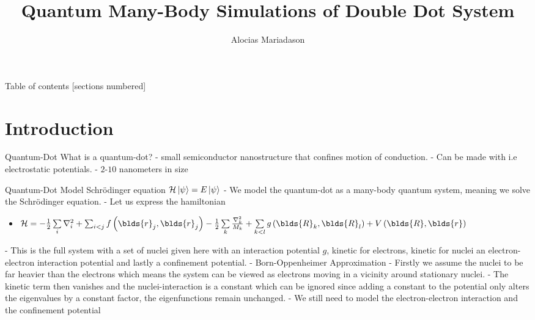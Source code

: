 \documentclass[10pt]{beamer}
\title{Quantum Many-Body Simulations of Double Dot System}
\date{}
\author{Alocias Mariadason}
\institute{Institute of Physics}
\begin{document}
\maketitle

\begin{frame}{Table of contents}
  [sections numbered]
  \tableofcontents[hideallsubsections]
\end{frame}

\section{Introduction}

\begin{frame}[fragile]{Quantum-Dot}
    What is a quantum-dot?
        - small semiconductor nanostructure that confines motion of conduction.
        - Can be made with i.e electrostatic potentials.
        - $2$-$10$ nanometers in size
\end{frame}

\begin{frame}[fragile]{Quantum-Dot Model}
    Schrödinger equation $\mathcal{H}\ket{\psi} = E\ket{\psi}$
        - We model the quantum-dot as a many-body quantum system, meaning we solve the Schrödinger equation.
        - Let us express the hamiltonian
            \begin{itemize}
                \item $\mathcal{H} = - \frac{1}{2} \sum\limits_i \nabla^2_i +
                    \sum_{i<j} f\left(\blds{r}_j, \blds{r}_j\right) -
                    \frac{1}{2} \sum\limits_k \frac{\nabla^2_k}{M_k} + \sum\limits_{k<l}
                    g\left(\blds{R}_k,\blds{R}_l\right) +
                    V\left(\blds{R},\blds{r}\right)$
            \end{itemize}
            - This is the full system with a set of nuclei given here with an
            interaction potential $g$, kinetic for electrons, kinetic for
            nuclei an electron-electron interaction potential and lastly a
            confinement potential.
        - Born-Oppenheimer Approximation
            - Firstly we assume the nuclei to be far heavier than the electrons
            which means the system can be viewed as electrons moving in a
            vicinity around stationary nuclei.
            - The kinetic term then vanishes and the nuclei-interaction is a
            constant which can be ignored since adding a constant to the
            potential only alters the eigenvalues by a constant factor, the
            eigenfunctions remain unchanged.
            - We still need to model the electron-electron interaction and the
            confinement potential
\end{frame}
\end{document}
